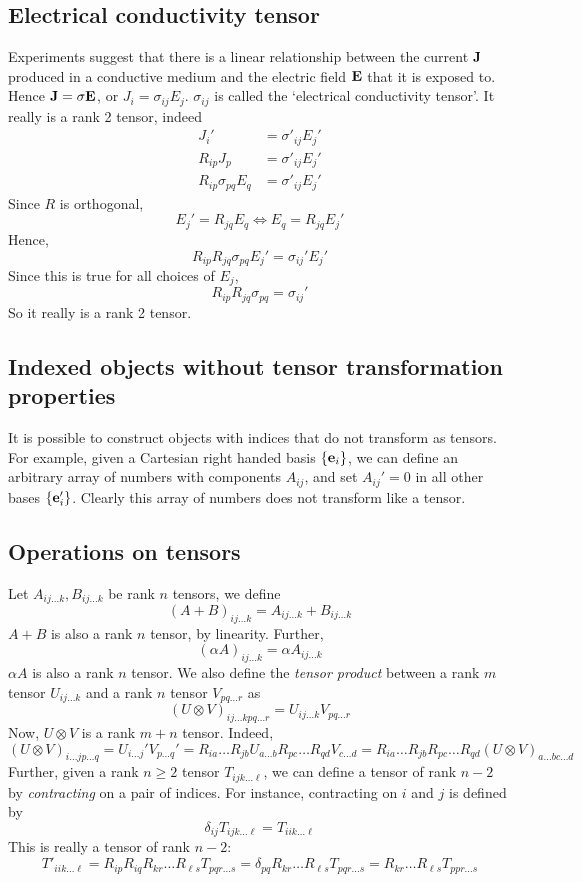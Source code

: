 \subsection{Electrical conductivity tensor}
Experiments suggest that there is a linear relationship between the current \(\vb J\) produced in a conductive medium and the electric field \(\vb E\) that it is exposed to.
Hence \(\vb J = \sigma \vb E\), or \(J_i = \sigma_{ij} E_j\).
\(\sigma_{ij}\) is called the `electrical conductivity tensor'.
It really is a rank 2 tensor, indeed
\begin{align*}
	J_i'                 & = \sigma'_{ij} E_j' \\
	R_{ip}J_p            & = \sigma'_{ij} E_j' \\
	R_{ip}\sigma_{pq}E_q & = \sigma'_{ij} E_j'
\end{align*}
Since \(R\) is orthogonal,
\[
	E_j' = R_{jq}E_q \iff E_q = R_{jq}E_j'
\]
Hence,
\[
	R_{ip}R_{jq}\sigma_{pq}E_j' = \sigma_{ij}'E_j'
\]
Since this is true for all choices of \(E_j\),
\[
	R_{ip}R_{jq}\sigma_{pq} = \sigma_{ij}'
\]
So it really is a rank 2 tensor.

\subsection{Indexed objects without tensor transformation properties}
It is possible to construct objects with indices that do not transform as tensors.
For example, given a Cartesian right handed basis \(\{ \vb e_i \}\), we can define an arbitrary array of numbers with components \(A_{ij}\), and set \(A_{ij}' = 0\) in all other bases \(\{ \vb e_i' \}\).
Clearly this array of numbers does not transform like a tensor.

\subsection{Operations on tensors}
Let \(A_{ij\dots k}, B_{ij\dots k}\) be rank \(n\) tensors, we define
\[
	(A + B)_{ij \dots k} = A_{ij\dots k} + B_{ij\dots k}
\]
\(A + B\) is also a rank \(n\) tensor, by linearity.
Further,
\[
	(\alpha A)_{ij\dots k} = \alpha A_{ij\dots k}
\]
\(\alpha A\) is also a rank \(n\) tensor.
We also define the \textit{tensor product} between a rank \(m\) tensor \(U_{ij\dots k}\) and a rank \(n\) tensor \(V_{pq \dots r}\) as
\[
	(U \otimes V)_{ij\dots kpq\dots r} = U_{ij\dots k}V_{pq \dots r}
\]
Now, \(U \otimes V\) is a rank \(m+n\) tensor.
Indeed,
\[
	(U \otimes V)_{i \dots j p\dots q} = U_{i\dots j}' V_{p\dots q}' = R_{ia} \dots R_{jb} U_{a \dots b} R_{pc} \dots R_{qd} V_{c \dots d} = R_{ia} \dots R_{jb} R_{pc} \dots R_{qd} (U \otimes V)_{a \dots b c\dots d}
\]
Further, given a rank \(n\geq 2\) tensor \(T_{ijk\dots \ell}\), we can define a tensor of rank \(n-2\) by \textit{contracting} on a pair of indices.
For instance, contracting on \(i\) and \(j\) is defined by
\[
	\delta_{ij} T_{ijk\dots \ell} = T_{iik\dots \ell}
\]
This is really a tensor of rank \(n-2\):
\[
	T'_{iik\dots \ell} = R_{ip}R_{iq}R_{kr}\dots R_{\ell s} T_{pqr\dots s} = \delta_{pq}R_{kr}\dots R_{\ell s} T_{pqr\dots s} = R_{kr}\dots R_{\ell s} T_{ppr\dots s}
\]

